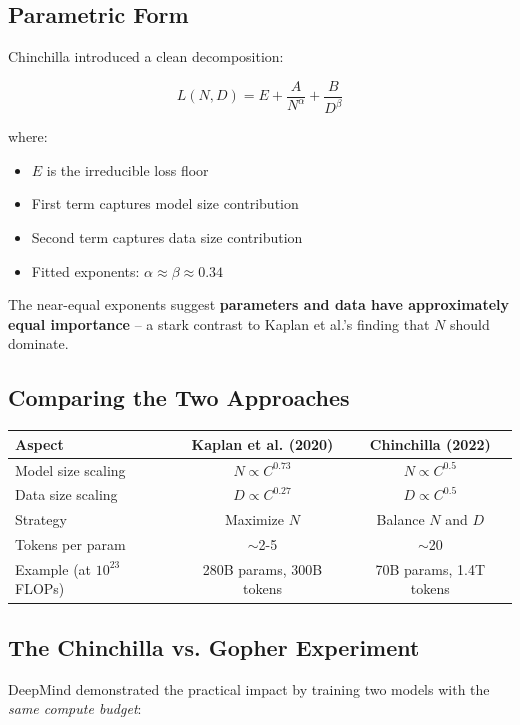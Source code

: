 \documentclass{article}
\begin{document}
\subsection{Parametric Form}

Chinchilla introduced a clean decomposition:

\[
L(N, D) = E + \frac{A}{N^\alpha} + \frac{B}{D^\beta}
\]

where:
\begin{itemize}
\item $E$ is the irreducible loss floor
\item First term captures model size contribution
\item Second term captures data size contribution
\item Fitted exponents: $\alpha \approx \beta \approx 0.34$
\end{itemize}

The near-equal exponents suggest \textbf{parameters and data have approximately equal importance} -- a stark contrast to Kaplan et al.'s finding that $N$ should dominate.

\subsection{Comparing the Two Approaches}

\begin{center}
\begin{tabular}{lcc}
\toprule
\textbf{Aspect} & \textbf{Kaplan et al. (2020)} & \textbf{Chinchilla (2022)} \\
\midrule
Model size scaling & $N \propto C^{0.73}$ & $N \propto C^{0.5}$ \\
Data size scaling & $D \propto C^{0.27}$ & $D \propto C^{0.5}$ \\
Strategy & Maximize $N$ & Balance $N$ and $D$ \\
Tokens per param & $\sim$2-5 & $\sim$20 \\
Example (at $10^{23}$ FLOPs) & 280B params, 300B tokens & 70B params, 1.4T tokens \\
\bottomrule
\end{tabular}
\end{center}

\subsection{The Chinchilla vs. Gopher Experiment}

DeepMind demonstrated the practical impact by training two models with the \textit{same compute budget}:
\end{document}
